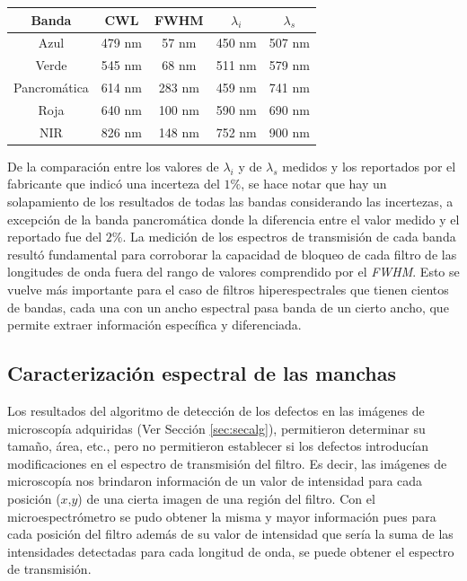  \begin{table}[H]
\begin{center}
\begin{tabular}{ |c|c|c|c|c| }    \toprule
Banda & CWL & FWHM & $\lambda_{i}$ & $\lambda_{s}$\\\midrule
\rowcolor{blue!15} Azul    & 479 nm & 57 nm & 450 nm & 507 nm  \\ 
\rowcolor{green!50} Verde  & 545 nm & 68 nm & 511 nm & 579 nm\\ 
Pancromática& 614 nm & 283 nm & 459 nm & 741 nm\\
\rowcolor{red!50} Roja & 640 nm & 100 nm  & 590 nm  & 690 nm\\
\rowcolor{maroon!20} NIR & 826 nm & 148 nm  &  752 nm & 900 nm\\
\bottomrule
 \hline
\end{tabular}
\end{center}
 \label{tabespc}
 \end{table}
De la comparación entre los valores de $\lambda_{i}$ y de $\lambda_{s}$ medidos y los reportados por el fabricante que indicó una incerteza del $1\%$, se hace notar que hay un solapamiento de los resultados de todas las bandas considerando las incertezas, a excepción de la banda pancromática donde la diferencia entre el valor medido y el reportado fue del $2\%$.
La medición de los espectros de transmisión de cada banda resultó fundamental para corroborar la capacidad de bloqueo de cada filtro de las longitudes de onda fuera del rango de valores comprendido por el \textit{FWHM}. Esto se vuelve más importante para el caso de filtros hiperespectrales que tienen cientos de bandas, cada una con un ancho espectral pasa banda de un cierto ancho, que permite extraer información específica y diferenciada.



\singlespacing
\subsection{Caracterización espectral de las manchas}
\label{sec:defctma}

\hspace{0.5cm}Los resultados del algoritmo de detección de los defectos en las imágenes de microscopía adquiridas (Ver Sección \ref{sec:secalg}), permitieron determinar su tamaño, área, etc., pero no permitieron establecer si los defectos introducían modificaciones en el espectro de transmisión del filtro. Es decir, las imágenes de microscopía nos brindaron información de un valor de intensidad para cada posición ($\textit{x,y}$) de una cierta imagen de una región del filtro. Con el microespectrómetro se pudo obtener la misma y mayor información pues para cada posición del filtro además de su valor de intensidad que sería la suma de las intensidades detectadas para cada longitud de onda, se puede obtener el espectro de transmisión.


